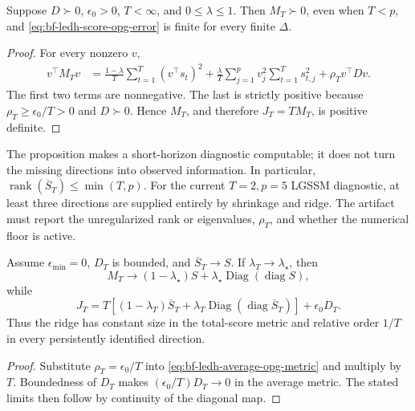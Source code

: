 \begin{proposition}
\label{prop:bf-ledh-average-opg-positive}
Suppose \(D\succ0\), \(\epsilon_0>0\), \(T<\infty\), and
\(0\leq\lambda\leq1\).  Then \(M_T\succ0\), even when \(T<p\), and
\eqref{eq:bf-ledh-score-opg-error} is finite for every finite \(\Delta\).
\end{proposition}

\begin{proof}
For every nonzero \(v\),
\begin{align*}
 v^\top M_Tv
 &=\frac{1-\lambda}{T}\sum_{t=1}^T(v^\top s_t)^2
   +\frac{\lambda}{T}\sum_{j=1}^p v_j^2
      \sum_{t=1}^T s_{t,j}^2
   +\rho_T v^\top Dv.
\end{align*}
The first two terms are nonnegative.  The last is strictly positive because
\(\rho_T\geq\epsilon_0/T>0\) and \(D\succ0\).  Hence \(M_T\), and therefore
\(J_T=T M_T\), is positive definite.
\end{proof}

The proposition makes a short-horizon diagnostic computable; it does not turn
the missing directions into observed information.  In particular,
\(\operatorname{rank}(\overline S_T)\leq\min(T,p)\).  For the current
\(T=2,p=5\) LGSSM diagnostic, at least three directions are supplied entirely
by shrinkage and ridge.  The artifact must report the unregularized rank or
eigenvalues, \(\rho_T\), and whether the numerical floor is active.

\begin{proposition}
\label{prop:bf-ledh-average-opg-vanishing-ridge}
Assume \(\epsilon_{\min}=0\), \(D_T\) is bounded, and
\(\overline S_T\to S\).  If \(\lambda_T\to\lambda_\star\), then
\[
  M_T\longrightarrow
  (1-\lambda_\star)S
  +\lambda_\star\operatorname{Diag}(\operatorname{diag}S),
\]
while
\[
  J_T
  =T\left[(1-\lambda_T)\overline S_T
  +\lambda_T\operatorname{Diag}(\operatorname{diag}\overline S_T)\right]
  +\epsilon_0D_T.
\]
Thus the ridge has constant size in the total-score metric and relative order
\(1/T\) in every persistently identified direction.
\end{proposition}

\begin{proof}
Substitute \(\rho_T=\epsilon_0/T\) into
\eqref{eq:bf-ledh-average-opg-metric} and multiply by \(T\).  Boundedness of
\(D_T\) makes \((\epsilon_0/T)D_T\to0\) in the average metric.  The stated
limits then follow by continuity of the diagonal map.
\end{proof}

